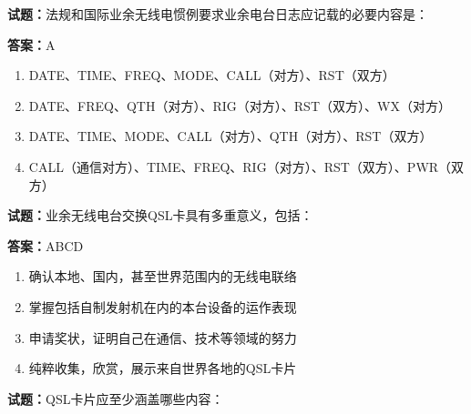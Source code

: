 \documentclass{ctexbook}
\begin{document}




\vspace{1em}

\textbf{试题：}法规和国际业余无线电惯例要求业余电台日志应记载的必要内容是： 

\textbf{答案：}A 

\begin{enumerate}[leftmargin=3em]
  \item DATE、TIME、FREQ、MODE、CALL（对方）、RST（双方） 

  \item DATE、FREQ、QTH（对方）、RIG（对方）、RST（双方）、WX（对方） 

  \item DATE、TIME、MODE、CALL（对方）、QTH（对方）、RST（双方） 

  \item CALL（通信对方）、TIME、FREQ、RIG（对方）、RST（双方）、PWR（双方） 

\end{enumerate}





\vspace{1em}

\textbf{试题：}业余无线电台交换QSL卡具有多重意义，包括： 

\textbf{答案：}ABCD 

\begin{enumerate}[leftmargin=3em]
  \item 确认本地、国内，甚至世界范围内的无线电联络 

  \item 掌握包括自制发射机在内的本台设备的运作表现 

  \item 申请奖状，证明自己在通信、技术等领域的努力 

  \item 纯粹收集，欣赏，展示来自世界各地的QSL卡片 

\end{enumerate}





\vspace{1em}

\textbf{试题：}QSL卡片应至少涵盖哪些内容： 
\end{document}
